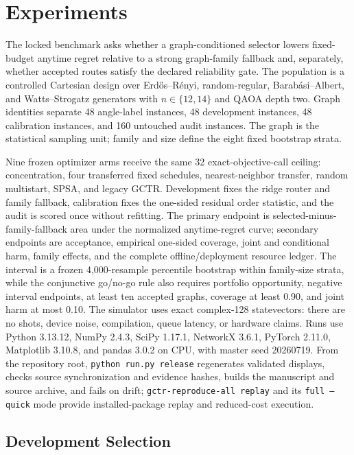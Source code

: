 \documentclass[aps,prx,reprint,superscriptaddress,floatfix]{revtex4-2}
\begin{document}
\section{Experiments}

The locked benchmark asks whether a graph-conditioned selector lowers
fixed-budget anytime regret relative to a strong graph-family fallback and,
separately, whether accepted routes satisfy the declared reliability gate.
The population is a controlled Cartesian design over Erd\H{o}s--R\'enyi,
random-regular, Barab\'asi--Albert, and Watts--Strogatz generators with
$n\in\{12,14\}$ and QAOA depth two.  Graph identities separate 48 angle-label
instances, 48 development instances, 48 calibration instances, and 160
untouched audit instances.  The graph is the statistical sampling unit; family
and size define the eight fixed bootstrap strata.

Nine frozen optimizer arms receive the same 32 exact-objective-call ceiling:
concentration, four transferred fixed schedules, nearest-neighbor transfer,
random multistart, SPSA, and legacy GCTR.  Development fixes the ridge router
and family fallback, calibration fixes the one-sided residual order statistic,
and the audit is scored once without refitting.  The primary endpoint is
selected-minus-family-fallback area under the normalized anytime-regret curve;
secondary endpoints are acceptance, empirical one-sided coverage, joint and
conditional harm, family effects, and the complete offline/deployment resource
ledger.  The interval is a frozen 4,000-resample percentile bootstrap within
family-size strata, while the conjunctive go/no-go rule also requires portfolio
opportunity, negative interval endpoints, at least ten accepted graphs,
coverage at least 0.90, and joint harm at most 0.10.  The simulator uses exact
complex-128 statevectors: there are no shots, device noise, compilation, queue
latency, or hardware claims.  Runs use Python 3.13.12, NumPy 2.4.3, SciPy
1.17.1, NetworkX 3.6.1, PyTorch 2.11.0, Matplotlib 3.10.8, and pandas 3.0.2
on CPU, with master seed 20260719.  From the repository root,
\texttt{python run.py release} regenerates validated displays, checks source
synchronization and evidence hashes, builds the manuscript and source archive,
and fails on drift; \texttt{gctr-reproduce-all replay} and its
\texttt{full --quick} mode provide installed-package replay and reduced-cost
execution.

\subsection{Development Selection}
\end{document}
